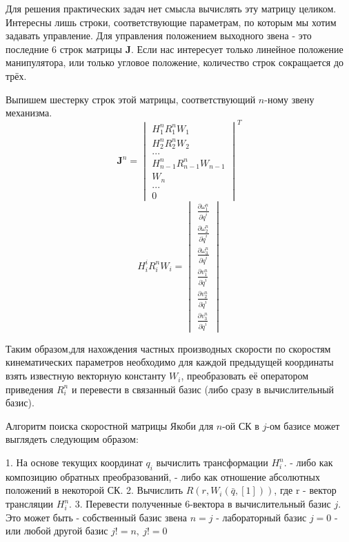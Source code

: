 Для решения практических задач нет смысла вычислять эту матрицу целиком. Интересны лишь строки, соответствующие параметрам, по которым мы хотим задавать управление. Для управления положением выходного звена - это последние 6 строк матрицы $\textbf{J}$. Если нас интересует только линейное положение манипулятора, или только угловое положение, количество строк сокращается до трёх.

Выпишем шестерку строк этой матрицы, соответствующий $n$-ному звену механизма.
\begin{equation}\label{}
\textbf{J}^n =  
\begin{vmatrix}
H^n_1R^n_1W_1 \\
H^n_2R^n_2W_2 \\
... \\
H^n_{n-1}R^n_{n-1}W_{n-1} \\
W_{n} \\
... \\
0
\end{vmatrix}^T
\end{equation}
\begin{equation}
H^i_iR^n_iW_i =
\begin{vmatrix}
\frac{\partial{\omega^n_1}}{\partial{\dot{q}^i}}\\
\frac{\partial{\omega^n_2}}{\partial{\dot{q}^i}}\\
\frac{\partial{\omega^n_3}}{\partial{\dot{q}^i}}\\
\frac{\partial{v^n_1}}{\partial{\dot{q}^i}}\\
\frac{\partial{v^n_2}}{\partial{\dot{q}^i}}\\
\frac{\partial{v^n_3}}{\partial{\dot{q}^i}}
\end{vmatrix}
\end{equation}


Таким образом,для нахождения частных производных скорости по скоростям кинематических параметров необходимо для каждой предыдущей координаты взять известную векторную константу $W_i$, преобразовать её оператором приведения $R^n_i$ и перевести в связанный базис (либо сразу в вычислительный базис). 

Алгоритм поиска скоростной матрицы Якоби для $n$-ой СК в $j$-ом базисе может выглядеть следующим образом:

1. На основе текущих координат $q_i$ вычислить трансформации $H^n_i$.
	- либо как композицию обратных преобразований,
	- либо как отношение абсолютных положений в некоторой СК. 
2. Вычислить $R(r, W_i(\bar{q},[1]))$, где r - вектор трансляции $H^n_i$.
3. Перевести полученные 6-вектора в вычислительный базис $j$. Это может быть 
	- собственный базис звена $n = j$
	- лабораторный базис $j = 0$
	- или любой другой базис $j != n,\ j != 0$